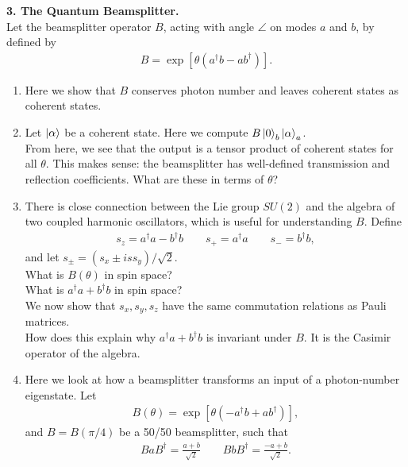 \documentclass{article}
\theoremstyle{definition}
\newcommand{\al}{\alpha}
\newcommand{\f}[2]{\frac{#1}{#2}}
\newcommand{\lp}{\left(}
\newcommand{\rp}{\right)}
\newcommand{\lb}{\left[}
\newcommand{\rb}{\right]}
\begin{document}
\noindent \textbf{3. The Quantum Beamsplitter.}\\

\noindent Let the beamsplitter operator $B$, acting with angle $\angle$ on modes $a$ and $b$, by defined by 
\begin{align*}
B = \exp\lb \theta \lp a^\dagger b - a b^\dagger \rp \rb .
\end{align*}

\begin{enumerate}[label=\alph*)]

\item Here we show that $B$ conserves photon number and leaves coherent states as coherent states. 

\item Let $\ket{\al}$ be a coherent state. Here we compute $B \ket{0}_b \ket{\al}_a$. \\

From here, we see that the output is a tensor product of coherent states for all $\theta$. This makes sense: the beamsplitter has well-defined transmission and reflection coefficients. What are these in terms of $\theta$? 

\item There is close connection between the Lie group $SU(2)$ and the algebra of two coupled harmonic oscillators, which is useful for understanding $B$. Define
\begin{align*}
s_z = a^\dagger a - b^\dagger b \quad\quad s_+ = a^\dagger a \quad\quad s_- = b^\dagger b,
\end{align*}
and let $s_\pm = (s_x \pm is s_y)/\sqrt{2}$. \\


What is $B(\theta)$ in spin space? \\

What is $a^\dagger a + b^\dagger b$ in spin space? \\

We now show that $s_x, s_y, s_z$ have the same commutation relations as Pauli matrices. \\

How does this explain why $a^\dagger a + b^\dagger b$ is invariant under $B$. It is the Casimir operator of the algebra. 

\item Here we look at how a beamsplitter transforms an input of a photon-number eigenstate. Let 
\begin{align*}
B(\theta) = \exp\lb \theta \lp -a^\dagger b + ab^\dagger  \rp\rb,
\end{align*}
and $B = B(\pi/4)$ be a 50/50 beamsplitter, such that
\begin{align*}
BaB^\dagger = \f{a+b}{\sqrt{2}} \quad\quad  BbB^\dagger = \f{-a + b}{\sqrt{2}}.
\end{align*}


\end{enumerate}
\end{document}
